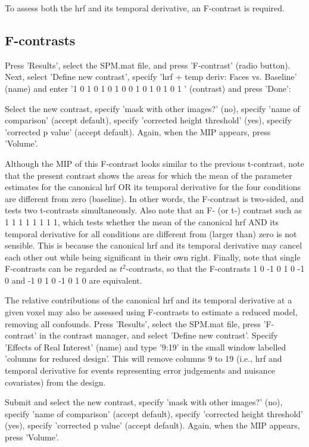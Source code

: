 \documentclass[a4paper,titlepage]{book}
\begin{document}
To assess both the hrf and its temporal derivative, an F-contrast is required. 

\subsection{F-contrasts}

Press 'Results', select the SPM.mat file, and press 'F-contrast' (radio button). Next, select 'Define new contrast', specify 'hrf + temp deriv: Faces vs. Baseline' (name) and enter
'1 0 1 0 1 0 1 0
0 1 0 1 0 1 0 1 ' (contrast) and press 'Done':
 
Select the new contrast, specify 'mask with other images?' (no), specify 'name of comparison' (accept default), specify 'corrected height threshold' (yes), specify 'corrected p value' (accept default). Again, when the MIP appears, press 'Volume'.

Although the MIP of this F-contrast looks similar to the previous t-contrast, note that the present contrast shows the areas for which the mean of the parameter estimates for the canonical hrf OR its temporal derivative for the four conditions are different from zero (baseline). In other words, the F-contrast is two-sided, and tests two t-contrasts simultaneously. Also note that an F- (or t-) contrast such as 1 1 1 1 1 1 1 1, which tests whether the mean of the canonical hrf AND its temporal derivative for all conditions are different from (larger than) zero is not sensible. This is because the canonical hrf and its temporal derivative may cancel each other out while being significant in their own right. Finally, note that single F-contrasts can be regarded as $t^2$-contrasts, so that the F-contrasts 1 0 -1 0 1 0 -1 0 and -1 0 1 0 -1 0 1 0 are equivalent. 

The relative contributions of the canonical hrf and its temporal derivative at a given voxel may also be assessed using F-contrasts to estimate a reduced model, removing all confounds. Press 'Results', select the SPM.mat file, press 'F-contrast' in the contrast manager, and select 'Define new contrast'. Specify 'Effects of Real Interest' (name) and type '9:19' in the small window labelled 'columns for reduced design'. This will remove columns 9 to 19 (i.e., hrf and temporal derivative for events representing error judgements and nuisance covariates) from the design. 

Submit and select the new contrast, specify 'mask with other images?' (no), specify 'name of comparison' (accept default), specify 'corrected height threshold' (yes), specify 'corrected p value' (accept default). Again, when the MIP appears, press 'Volume'.
\end{document}
